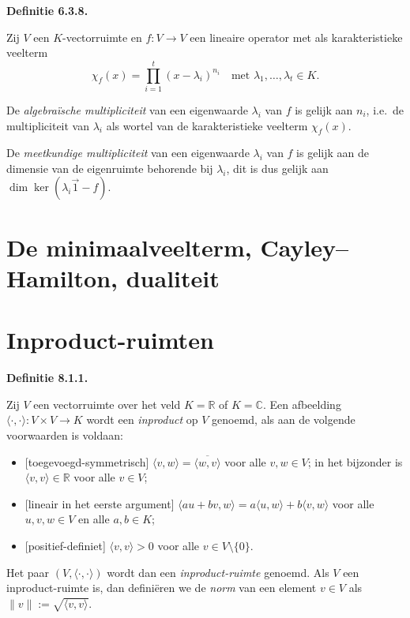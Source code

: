 \documentclass[10pt,a4paper]{article}
\newenvironment{res}[1]{%
  \par\noindent\textbf{Definitie #1.}~\ignorespaces
}{%
  \par\vspace{2pt}\normalfont
}
\begin{document}
\begin{res}{6.3.8}
Zij $V$ een $K$-vectorruimte en $f:V\to V$ een lineaire operator met als karakteristieke veelterm
\[
\chi_f(x)=\prod_{i=1}^t (x-\lambda_i)^{n_i} \quad\text{met } \lambda_1,\dots,\lambda_t\in K.
\]
\begin{myenum}
\item De \textit{algebra\"ische multipliciteit} van een eigenwaarde $\lambda_i$ van $f$ is gelijk aan $n_i$, i.e.\ de multipliciteit van $\lambda_i$ als wortel van de karakteristieke veelterm $\chi_f(x)$.
\item De \textit{meetkundige multipliciteit} van een eigenwaarde $\lambda_i$ van $f$ is gelijk aan de dimensie van de eigenruimte behorende bij $\lambda_i$, dit is dus gelijk aan $\dim\ker(\lambda_i\vec 1-f)$.
\end{myenum}
\end{res}

\section{De minimaalveelterm, Cayley--Hamilton, dualiteit}


\section{Inproduct-ruimten}

\begin{res}{8.1.1}
Zij $V$ een vectorruimte over het veld $K=\mathbb R$ of $K=\mathbb C$. Een afbeelding $\langle\cdot,\cdot\rangle:V\times V\to K$ wordt een \textit{inproduct} op $V$ genoemd, als aan de volgende voorwaarden is voldaan:
\begin{itemize}[leftmargin=1.8em,itemsep=1pt,topsep=1pt]
\item[$\bullet$] \textup{[toegevoegd-symmetrisch]} $\langle v,w\rangle=\overline{\langle w,v\rangle}$ voor alle $v,w\in V$; in het bijzonder is $\langle v,v\rangle\in\mathbb R$ voor alle $v\in V$;
\item[$\bullet$] \textup{[lineair in het eerste argument]} $\langle au+bv,w\rangle=a\langle u,w\rangle+b\langle v,w\rangle$ voor alle $u,v,w\in V$ en alle $a,b\in K$;
\item[$\bullet$] \textup{[positief-definiet]} $\langle v,v\rangle>0$ voor alle $v\in V\setminus\{0\}$.
\end{itemize}
Het paar $(V,\langle\cdot,\cdot\rangle)$ wordt dan een \textit{inproduct-ruimte} genoemd. Als $V$ een inproduct-ruimte is, dan defini\"eren we de \textit{norm} van een element $v\in V$ als $\|v\|:=\sqrt{\langle v,v\rangle}$.
\end{res}
\end{document}
